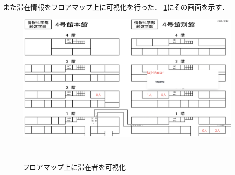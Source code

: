 また滞在情報をフロアマップ上に可視化を行った．
\ref{fig:floor}にその画面を示す．


\begin{figure}[tbh]
  \centering
  \includegraphics[width=13cm]{image/floorMap.jpg}
  \caption{フロアマップ上に滞在者を可視化}　\label{fig:floor}
\end{figure}




















